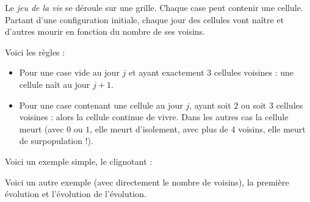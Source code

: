 \documentclass[11pt,class=report,crop=false]{standalone}
\begin{document}
\begin{cours}
Le \emph{jeu de la vie} se déroule sur une grille. Chaque case peut contenir une cellule. Partant d'une configuration initiale, chaque jour des cellules vont naître et d'autres mourir en fonction du nombre de ses voisins.

Voici les règles :
\begin{itemize}
  \item Pour une case vide au jour $j$ et ayant exactement $3$ cellules voisines : une cellule naît au jour $j+1$.


  \item Pour une case contenant une cellule au jour $j$, ayant soit $2$ ou soit $3$ cellules voisines : alors la cellule continue de vivre.
  Dans les autres cas la cellule meurt (avec $0$ ou $1$, elle meurt d'isolement, avec plus de $4$ voisins, elle meurt de surpopulation !).
  
  \medskip
  

   \medskip
    
\end{itemize}

Voici un exemple simple, le \og{}clignotant\fg{} :

 
Voici un autre exemple (avec directement le nombre de voisins), la première évolution et l'évolution de l'évolution.

\end{cours}



\end{document}
